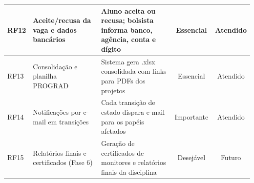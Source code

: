 \documentclass[portuguese]{sbc2025}%
\begin{document}
\begin{table}[H]
\begin{tabular}{|l|p{5.5cm}|p{6.0cm}|c|c|}
    RF12 & Aceite/recusa da vaga e dados bancários & Aluno aceita ou recusa; bolsista informa banco, agência, conta e dígito & Essencial & Atendido \\ \hline
    RF13 & Consolidação e planilha PROGRAD & Sistema gera .xlsx consolidada com links para PDFs dos projetos & Essencial & Atendido \\ \hline
    RF14 & Notificações por e-mail em transições & Cada transição de estado dispara e-mail para os papéis afetados & Importante & Atendido \\ \hline
    RF15 & Relatórios finais e certificados (Fase 6) & Geração de certificados de monitores e relatórios finais da disciplina & Desejável & Futuro \\ \hline
  \end{tabular}
\end{table}
\end{document}

